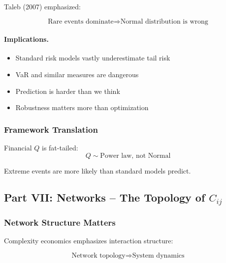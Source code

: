 Taleb (2007) emphasized:

\begin{equation}
\boxed{
\text{Rare events dominate} \Rightarrow \text{Normal distribution is wrong}
}
\label{eq:taleb}
\end{equation}

\paragraph{Implications.}
\begin{itemize}
    \item Standard risk models vastly underestimate tail risk
    \item VaR and similar measures are dangerous
    \item Prediction is harder than we think
    \item Robustness matters more than optimization
\end{itemize}

\subsubsection{Framework Translation}

Financial $Q$ is fat-tailed:
\begin{equation}
Q \sim \text{Power law, not Normal}
\end{equation}

Extreme events are more likely than standard models predict.

\subsection{Part VII: Networks – The Topology of $C_{ij}$}

\subsubsection{Network Structure Matters}

Complexity economics emphasizes interaction structure:

\begin{equation}
\boxed{
\text{Network topology} \Rightarrow \text{System dynamics}
}
\label{eq:networks}
\end{equation}

